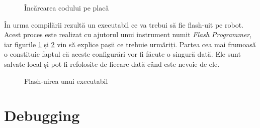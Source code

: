 \begin{figure}
    \vspace{-25pt}
    \vspace{-20pt}
    \caption{\label{fig:CodeWarrior-FlashProgrammer1} Încărcarea codului pe placă}
    \vspace{-20pt}
\end{figure}

În urma compilării rezultă un executabil ce va trebui să fie flash-uit pe robot. Acest proces este realizat cu ajutorul unui instrument numit \textit{Flash Programmer}, iar figurile \ref{fig:CodeWarrior-FlashProgrammer1} și \ref{fig:CodeWarrior-FlashProgrammer2} vin să explice pașii ce trebuie urmăriți. Partea cea mai frumoasă o constituie faptul că aceste configurări vor fi făcute o singură dată. Ele sunt salvate local și pot fi refolosite de fiecare dată când este nevoie de ele.

\begin{figure}
    \vspace{-70pt}
    \vspace{-20pt}
    \caption{\label{fig:CodeWarrior-FlashProgrammer2} Flash-uirea unui executabil}
    \vspace{-20pt}
\end{figure}

\section{Debugging}

